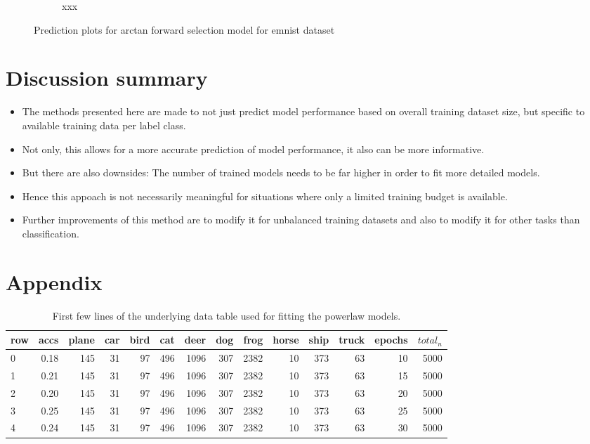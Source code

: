 \documentclass{article} %
\begin{document}
\begin{figure}
\begin{subfigure}{.33\textwidth}
        \caption{xxx}
        \label{fig:emnist_prediction_plot_val}
    \end{subfigure}
    \caption{Prediction plots for arctan forward selection model for emnist dataset}
    \label{fig:emnist_prediction_plot}
\end{figure}
\section{Discussion summary}

\begin{itemize}
    \item The methods presented here are made to not just predict model performance based on overall training dataset size, but specific to available training data per label class.
    \item Not only, this allows for a more accurate prediction of model performance, it also can be more informative.
    \item But there are also downsides: The number of trained models needs to be far higher in order to fit more detailed models.
    \item Hence this appoach is not necessarily meaningful for situations where only a limited training budget is available.
    \item Further improvements of this method are to modify it for unbalanced training datasets and also to modify it for other tasks than classification.
\end{itemize}
\pagebreak



\section*{Appendix}



\begin{table}[h!]
    \centering
    \begin{tabular}{lrrrrrrrrrrrrr}
        row & accs & plane & car & bird & cat & deer & dog & frog & horse & ship & truck & epochs & $total_n$ \\
        \hline
        0   & 0.18 & 145   & 31  & 97   & 496 & 1096 & 307 & 2382 & 10    & 373  & 63    & 10     & 5000      \\
        1   & 0.21 & 145   & 31  & 97   & 496 & 1096 & 307 & 2382 & 10    & 373  & 63    & 15     & 5000      \\
        2   & 0.20 & 145   & 31  & 97   & 496 & 1096 & 307 & 2382 & 10    & 373  & 63    & 20     & 5000      \\
        3   & 0.25 & 145   & 31  & 97   & 496 & 1096 & 307 & 2382 & 10    & 373  & 63    & 25     & 5000      \\
        4   & 0.24 & 145   & 31  & 97   & 496 & 1096 & 307 & 2382 & 10    & 373  & 63    & 30     & 5000      \\
    \end{tabular}
    \caption{First few lines of the underlying data table used for fitting the powerlaw models.}
    \label{table:datatable_results}
\end{table}
\end{document}
